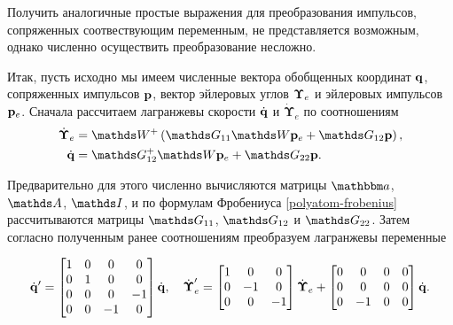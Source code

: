 Получить аналогичные простые выражения для преобразования импульсов, сопряженных соотвествующим переменным, не представляется возможным, однако численно осуществить преобразование несложно. \par
Итак, пусть исходно мы имеем численные вектора обобщенных координат $\mathbf{q}$, сопряженных импульсов $\mathbf{p}$, вектор эйлеровых углов $\boldsymbol{\Upsilon}_e$ и эйлеровых импульсов $\mathbf{p}_e$. Сначала рассчитаем лагранжевы скорости $\dot{\mathbf{q}}$ и $\dot{\boldsymbol{\Upsilon}}_e$ по соотношениям
\begin{gather}
    \begin{aligned}
        \dot{\boldsymbol{\Upsilon}}_e &= \bbW^+ \lb \bbG_{11} \bbW \pe + \bbG_{12} \mf{p} \rb, \\
        \dot{\mf{q}} &= \bbG_{12}^+ \bbW \pe + \bbG_{22} \mf{p}.
    \end{aligned}
\end{gather}

Предварительно для этого численно вычисляются матрицы $\bba$, $\bbA$, $\bbI$, и по формулам Фробениуса \eqref{polyatom-frobenius} рассчитываются матрицы $\bbG_{11}$, $\bbG_{12}$ и $\bbG_{22}$. Затем согласно полученным ранее соотношениям преобразуем лагранжевы переменные 

\begin{gather}
    \dot{\mathbf{q}}^\prime = 
    \begin{bmatrix}
        1 & 0 & 0 & 0 \\
        0 & 1 & 0 & 0 \\
        0 & 0 & 0 & -1 \\
        0 & 0 & -1 & 0 
    \end{bmatrix} \dot{\mathbf{q}}, \quad
    \dot{\boldsymbol{\Upsilon}}_e^\prime = 
    \begin{bmatrix}
        1 & 0 & 0 \\
        0 & -1 & 0 \\
        0 & 0 & -1
    \end{bmatrix}
    \dot{\boldsymbol{\Upsilon}}_e + 
    \begin{bmatrix}
        0 & 0 & 0 & 0 \\
        0 & 0 & 0 & 0 \\
        0 & -1 & 0 & 0 
    \end{bmatrix}
    \dot{\mathbf{q}}.
\end{gather}

